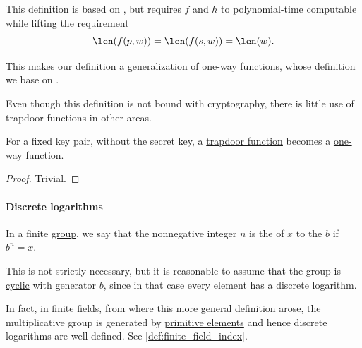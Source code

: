 \begin{comments}
  \item This definition is based on \cite[def. 10.47]{Sipser2013TheoryOfComputation}, but requires \( f \) and \( h \) to polynomial-time computable while lifting the requirement
  \begin{equation*}
    \len(f(p, w)) = \len(f(s, w)) = \len(w).
  \end{equation*}

  This makes our definition a generalization of one-way functions, whose definition we base on \cite[def. 9.4]{AroraBarak2009ComputationalComplexity}.

  \item Even though this definition is not bound with cryptography, there is little use of trapdoor functions in other areas.
\end{comments}

\begin{proposition}\label{thm:trapdoor_to_one_way_function}
  For a fixed key pair, without the secret key, a \hyperref[def:trapdoor_function]{trapdoor function} becomes a \hyperref[def:one_way_function]{one-way function}.
\end{proposition}
\begin{proof}
  Trivial.
\end{proof}

\paragraph{Discrete logarithms}

\begin{definition}\label{def:discrete_logarithm}
  In a finite \hyperref[def:group]{group}, we say that the nonnegative integer \( n \) is the  of \( x \) to the  \( b \) if \( b^n = x \).
\end{definition}
\begin{comments}
  \item This is not strictly necessary, but it is reasonable to assume that the group is \hyperref[def:cyclic_group]{cyclic} with generator \( b \), since in that case every element has a discrete logarithm.

  In fact, in \hyperref[def:finite_field]{finite fields}, from where this more general definition arose, the multiplicative group is generated by \hyperref[def:finite_field_primitive_element]{primitive elements} and hence discrete logarithms are well-defined. See \cref{def:finite_field_index}.
\end{comments}


